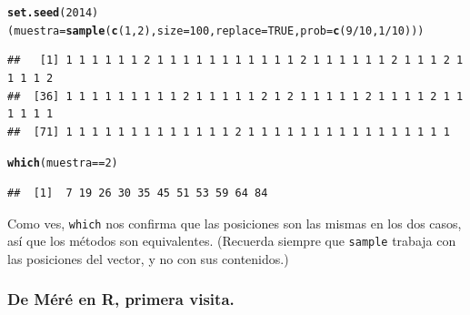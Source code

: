 \documentclass[10pt,a4paper]{article}\usepackage[]{graphicx}\usepackage[]{color}
\makeatletter
\newcommand{\hlnum}[1]{\textcolor[rgb]{0.686,0.059,0.569}{#1}}%
\newcommand{\hlopt}[1]{\textcolor[rgb]{0,0,0}{#1}}%
\newcommand{\hlstd}[1]{\textcolor[rgb]{0.345,0.345,0.345}{#1}}%
\newcommand{\hlkwb}[1]{\textcolor[rgb]{0.69,0.353,0.396}{#1}}%
\newcommand{\hlkwc}[1]{\textcolor[rgb]{0.333,0.667,0.333}{#1}}%
\newcommand{\hlkwd}[1]{\textcolor[rgb]{0.737,0.353,0.396}{\textbf{#1}}}%
\newenvironment{kframe}{%
 \def\at@end@of@kframe{}%
 \ifinner\ifhmode%
  \def\at@end@of@kframe{\end{minipage}}%
  \begin{minipage}{\columnwidth}%
 \fi\fi%
 \def\FrameCommand##1{\hskip\@totalleftmargin \hskip-\fboxsep
 \colorbox{shadecolor}{##1}\hskip-\fboxsep
     \hskip-\linewidth \hskip-\@totalleftmargin \hskip\columnwidth}%
 \MakeFramed {\advance\hsize-\width
   \@totalleftmargin\z@ \linewidth\hsize
   \@setminipage}}%
 {\par\unskip\endMakeFramed%
 \at@end@of@kframe}
\newenvironment{knitrout}{}{} %
\newcounter {cont01}
\makeatother
\begin{document}
\begin{knitrout}
\color{fgcolor}\begin{kframe}
\begin{alltt}
\hlkwd{set.seed}\hlstd{(}\hlnum{2014}\hlstd{)}
\hlstd{(muestra} \hlkwb{=} \hlkwd{sample}\hlstd{(}\hlkwd{c}\hlstd{(}\hlnum{1}\hlstd{,}\hlnum{2}\hlstd{),} \hlkwc{size}\hlstd{=}\hlnum{100}\hlstd{,} \hlkwc{replace}\hlstd{=}\hlnum{TRUE}\hlstd{,} \hlkwc{prob}\hlstd{=}\hlkwd{c}\hlstd{(}\hlnum{9}\hlopt{/}\hlnum{10}\hlstd{,} \hlnum{1}\hlopt{/}\hlnum{10}\hlstd{) ) )}
\end{alltt}
\begin{verbatim}
##   [1] 1 1 1 1 1 1 2 1 1 1 1 1 1 1 1 1 1 1 2 1 1 1 1 1 1 2 1 1 1 2 1 1 1 1 2
##  [36] 1 1 1 1 1 1 1 1 1 2 1 1 1 1 1 2 1 2 1 1 1 1 1 2 1 1 1 1 2 1 1 1 1 1 1
##  [71] 1 1 1 1 1 1 1 1 1 1 1 1 1 2 1 1 1 1 1 1 1 1 1 1 1 1 1 1 1 1
\end{verbatim}
\begin{alltt}
\hlkwd{which}\hlstd{(muestra}\hlopt{==}\hlnum{2}\hlstd{)}
\end{alltt}
\begin{verbatim}
##  [1]  7 19 26 30 35 45 51 53 59 64 84
\end{verbatim}
\end{kframe}
\end{knitrout}
Como ves, {\tt which} nos confirma que las posiciones son las mismas en los dos casos, así que los métodos son equivalentes. (Recuerda siempre que {\tt sample} trabaja con las posiciones del vector, y no con sus contenidos.)

\subsubsection{De Méré en R, primera visita.}
\label{tut03:subsubsec:DeMereRPrimeraVisita}
\end{document}
